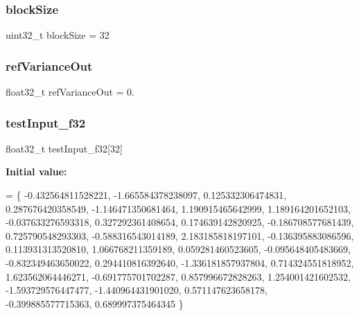 \subsubsection{\texorpdfstring{block\+Size}{blockSize}}
{\footnotesize\ttfamily uint32\+\_\+t block\+Size = 32}

\mbox{\label{pkg__cmsis-dsp_2main_8c_a26cbbfe2a7905669e8440159465050df}} 
\subsubsection{\texorpdfstring{ref\+Variance\+Out}{refVarianceOut}}
{\footnotesize\ttfamily float32\+\_\+t ref\+Variance\+Out = 0.}

\mbox{\label{pkg__cmsis-dsp_2main_8c_a9170ec9e681e2b519fe9c46a30455841}} 
\subsubsection{\texorpdfstring{test\+Input\+\_\+f32}{testInput\_f32}}
{\footnotesize\ttfamily float32\+\_\+t test\+Input\+\_\+f32\mbox{[}32\mbox{]}}

{\bfseries Initial value\+:}
\begin{DoxyCode}
=
\{
  -0.432564811528221,  -1.665584378238097,   0.125332306474831,   0.287676420358549,
  -1.146471350681464,   1.190915465642999,   1.189164201652103,  -0.037633276593318,
   0.327292361408654,   0.174639142820925,  -0.186708577681439,   0.725790548293303,
  -0.588316543014189,   2.183185818197101,  -0.136395883086596,   0.113931313520810,
   1.066768211359189,   0.059281460523605,  -0.095648405483669,  -0.832349463650022,
   0.294410816392640,  -1.336181857937804,   0.714324551818952,   1.623562064446271,
  -0.691775701702287,   0.857996672828263,   1.254001421602532,  -1.593729576447477,
  -1.440964431901020,   0.571147623658178,  -0.399885577715363,   0.689997375464345
\}
\end{DoxyCode}
\mbox{\label{pkg__cmsis-dsp_2main_8c_acc43b372d92d5027b9f9cac782c8b3c7}} 
